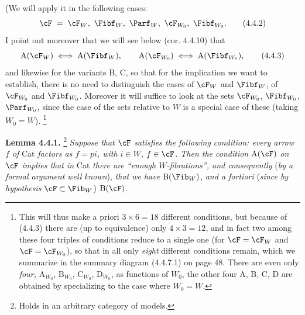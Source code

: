 (We will apply it in the following cases: %
\[
\cF \;=\; \cF_W,\ \Fibf_W,\ \Parf_W,\ \cF_{W_0},\ \Fibf_{W_0}.
\tag*{(4.4.2)}
\]
I point out moreover that we will see below (cor. 4.4.10) that
\[
\mathrm{A}(\cF_W) \iff \mathrm{A}(\Fibf_W), \qquad \mathrm{A}(\cF_{W_0}) \iff \mathrm{A}(\Fibf_{W_0}),
\tag*{(4.4.3)}
\]
and likewise for the variants B, C, so that for the implication we want to establish, there is no need to distinguish the cases of $\cF_W$ and $\Fibf_W$, of $\cF_{W_0}$ and $\Fibf_{W_0}$. Moreover it will suffice to look at the sets $\cF_{W_0}$, $\Fibf_{W_0}$, $\Parf_{W_0}$, since the case of the sets relative to $W$ is a special case of these (taking $W_0 = W$). \footnote[28]{This will thus make a priori $3 \times 6 = 18$ different conditions, but because of (4.4.3) there are (up to equivalence) only $4 \times 3 = 12$, and in fact two among these four triples of conditions reduce to a single one (for $\cF = \cF_W$ and $\cF = \cF_{W_0}$), so that in all only \textit{eight} different conditions remain, which we summarize in the summary diagram (4.4.7.1) on page 48. There are even only \textit{four,} $\mathrm{A}_{W_0}$, $\mathrm{B}_{W_0}$, $\mathrm{C}_{W_0}$, $\mathrm{D}_{W_0}$, as functions of $W_0$, the other four A, B, C, D are obtained by specializing to the case where $W_0 = W$.}


\textbf{Lemma 4.4.1.} \footnote[29]{Holds in an arbitrary category of models.} \textit{Suppose that $\cF$ satisfies the following condition: every arrow $f$ of} Cat \textit{factors as $f = pi$, with $i \in W$, $f \in \cF$. Then the condition} $\mathrm{A}(\cF)$ \textit{on $\cF$ implies that in} Cat \textit{there are ``enough $W$-fibrations'', and consequently} (\textit{by a formal argument well} %
{}
\textit{known}), \textit{that we have} $\mathrm{B}(\Fib_W)$, \textit{and a fortiori} (\textit{since by hypothesis} $\cF \subset \Fib_W$) $\mathrm{B}(\cF)$.

